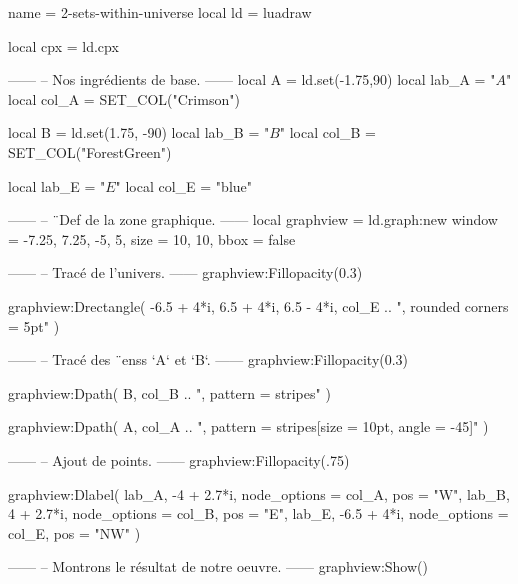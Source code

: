 \documentclass[border = 3pt]{standalone}
\begin{document}
\begin{luadraw*}{name = 2-sets-within-universe}
local ld = luadraw

local cpx = ld.cpx

------
-- Nos ingrédients de base.
------
local A     = ld.set(-1.75,90)
local lab_A = "$A$"
local col_A = SET_COL("Crimson")

local B     = ld.set(1.75, -90)
local lab_B = "$B$"
local col_B = SET_COL("ForestGreen")

local lab_E = "$E$"
local col_E = "blue"

------
-- ¨Def de la zone graphique.
------
local graphview = ld.graph:new{
  window = {-7.25, 7.25, -5, 5},
  size   = {10, 10},
  bbox   = false
}

------
-- Tracé de l'univers.
------
graphview:Fillopacity(0.3)

graphview:Drectangle(
  -6.5 + 4*i, 6.5 + 4*i, 6.5 - 4*i,
  col_E .. ", rounded corners = 5pt"
)

------
-- Tracé des ¨enss `A` et `B`.
------
graphview:Fillopacity(0.3)

graphview:Dpath(
  B,
  col_B .. ", pattern = stripes"
)

graphview:Dpath(
  A,
  col_A .. ", pattern = {stripes[size = 10pt, angle = -45]}"
)

------
-- Ajout de points.
------
graphview:Fillopacity(.75)

graphview:Dlabel(
  lab_A, -4 + 2.7*i, {node_options = col_A, pos = "W"},
  lab_B,  4 + 2.7*i, {node_options = col_B, pos = "E"},
  lab_E, -6.5 + 4*i, {node_options = col_E, pos = "NW"}
)

------
-- Montrons le résultat de notre oeuvre.
------
graphview:Show()
\end{luadraw*}
\end{document}
